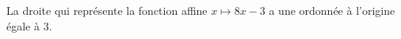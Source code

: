 La droite qui représente la fonction affine $x\mapsto 8x-3$ a une ordonnée à l'origine égale à $3$.

\begin{reponses}
\end{reponses}

\begin{comment}

\end{comment}

